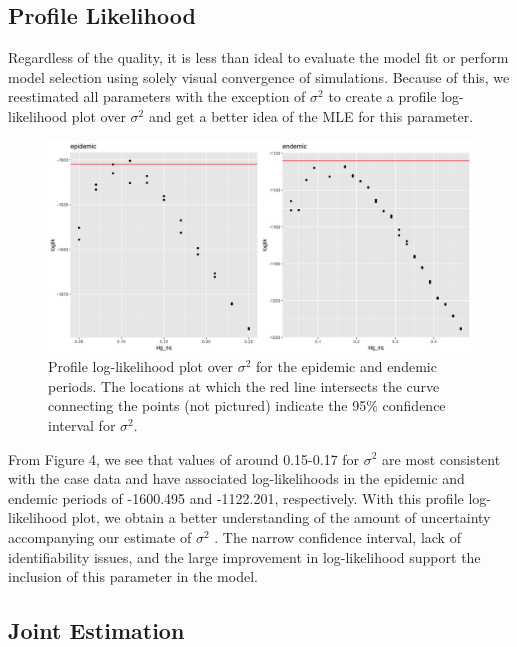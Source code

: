 \documentclass[12pt]{article}
\begin{document}
\subsection{Profile Likelihood}

  Regardless of the quality, it is less than ideal to evaluate the model fit or perform model selection using solely visual convergence of simulations. Because of this, we reestimated all parameters with the exception of $\sigma^2$ to create a profile log-likelihood plot over $\sigma^2$ and get a better idea of the MLE for this parameter.
        \begin{figure}[H]
          \centering
          \includegraphics[width=150mm]{prof_lik_plot.png}
          \caption{Profile log-likelihood plot over $\sigma^2$ for the epidemic and endemic periods. The locations at which the red line intersects the curve connecting the points (not pictured) indicate the 95\% confidence interval for $\sigma^2$.}
        \end{figure}

  From Figure 4, we see that values of around 0.15-0.17 for $\sigma^2$ are most consistent with the case data and have associated log-likelihoods in the epidemic and endemic periods of -1600.495 and -1122.201, respectively. With this profile log-likelihood plot, we obtain a better understanding of the amount of uncertainty accompanying our estimate of $\sigma^2$ \cite{Cole}. The narrow confidence interval, lack of identifiability issues, and the large improvement in log-likelihood support the inclusion of this parameter in the model. 

\subsection{Joint Estimation}
\end{document}
